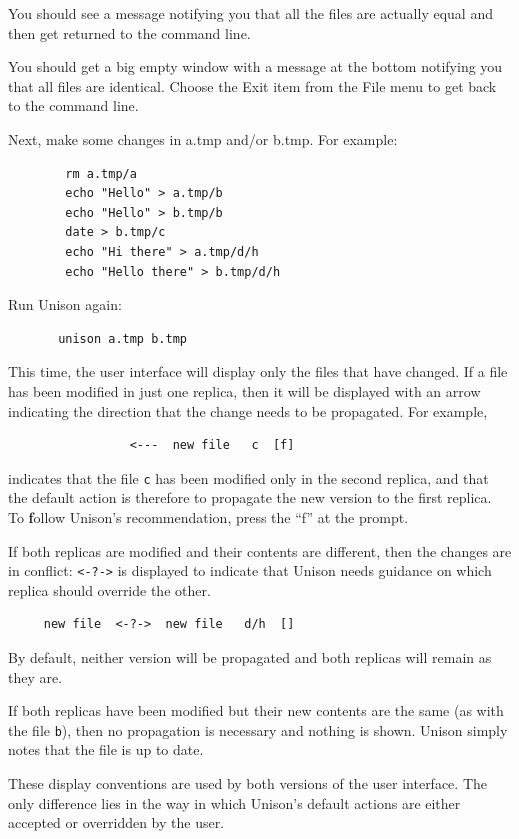 \documentclass{article}
\begin{document}
\begin{textui}
You should see a message notifying you that all the files are actually
equal and then get returned to the command line.
\end{textui}

\begin{tkui}
You should get a big empty window with a message at the bottom
notifying you that all files are identical.  Choose the Exit item from
the File menu to get back to the command line.
\end{tkui}

Next, make some changes in a.tmp and/or b.tmp.  For example:
\begin{verbatim}
        rm a.tmp/a
        echo "Hello" > a.tmp/b
        echo "Hello" > b.tmp/b
        date > b.tmp/c
        echo "Hi there" > a.tmp/d/h
        echo "Hello there" > b.tmp/d/h
\end{verbatim}
Run Unison again:
\begin{verbatim}
       unison a.tmp b.tmp
\end{verbatim}

This time, the user interface will display only the files that have
changed.  If a file has been modified in just one
replica, then it will be displayed with an arrow indicating the
direction that the change needs to be propagated.  For example,
\begin{verbatim}
                 <---  new file   c  [f]
\end{verbatim}
\noindent
indicates that the file {\tt c} has been modified only in the second
replica, and that the default action is therefore to propagate the new
version to the first replica.  To {\bf f}ollow Unison's recommendation,
press the ``f'' at the prompt.

If both replicas are modified and their contents are different, then
the changes are in conflict: \texttt{<-?->} is displayed to indicate
that Unison needs guidance on which replica should override the
other.
\begin{verbatim}
     new file  <-?->  new file   d/h  []
\end{verbatim}
By default, neither version will be propagated and both
replicas will remain as they are.

If both replicas have been modified but their new contents are the same
(as with the file {\tt b}), then no propagation is necessary and
nothing is shown.  Unison simply notes that the file is up to date.

These display conventions are used by both versions of the user
interface.  The only difference lies in the way in which Unison's
default actions are either accepted or overridden by the user.
\end{document}
